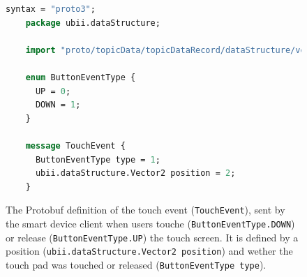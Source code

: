 \begin{figure}[H]
	\begin{lstlisting}[language=Protobuf]
    syntax = "proto3";
    package ubii.dataStructure;
    
    import "proto/topicData/topicDataRecord/dataStructure/vector2.proto";
    
    enum ButtonEventType {
      UP = 0;
      DOWN = 1;
    }

    message TouchEvent {
      ButtonEventType type = 1;
      ubii.dataStructure.Vector2 position = 2;
    }
  \end{lstlisting}
	\caption[Protobuf definition of the touch event]{The \gls{Protobuf} definition of the touch event (\lstinline{TouchEvent}), sent by the smart device client when users touche (\lstinline{ButtonEventType.DOWN}) or release (\lstinline{ButtonEventType.UP}) the touch screen. It is defined by a position (\lstinline{ubii.dataStructure.Vector2 position}) and wether the touch pad was touched or released (\lstinline{ButtonEventType type}).}\label{fig:ubii-event-type}
\end{figure}
